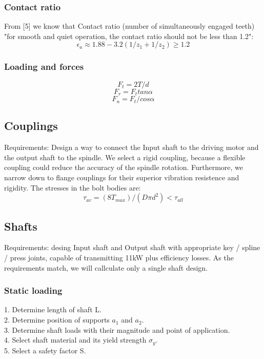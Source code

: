 \documentclass{article}
\begin{document}
\subsubsection{Contact ratio} %
From [5] we know that Contact ratio (number of simultaneously engaged teeth) "for smooth and quiet operation, the contact ratio should not be less than 1.2":
$$\epsilon_a \approx 1.88 - 3.2 (1/z_1 + 1/z_2) \geq 1.2$$
\subsubsection{Loading and forces}
$$F_t = 2T / d$$ %
$$F_r = F_t tan\alpha$$
$$F_n = F_t / cos \alpha $$ %

\subsection{Couplings}
Requirements: Design a way to connect the Input shaft to the driving motor and the output shaft to the spindle.
We select a rigid coupling, because a flexible coupling could reduce the accuracy of the spindle rotation.
Furthermore, we narrow down to flange couplings for their superior vibration resistence and rigidity.
The stresses in the bolt bodies are:
$$\tau_{av} = (8 T_{max}) / (D \pi d^2) < \tau_{all}$$  %

\subsection{Shafts}
Requirements: desing Input shaft and Output shaft with appropriate key / spline / press  joints, capable of transmitting 11kW plus efficiency losses.
As the requirements match, we will callculate only a single shaft design.
\subsubsection{Static loading}
1. Determine length of shaft L. \\
2. Determine position of supports $a_1$ and $a_2$. \\
3. Determine shaft loads with their magnitude and point of application. \\
4. Select shaft material and its yield strength $\sigma_y$. \\
5. Select a safety factor S. \\
\end{document}
